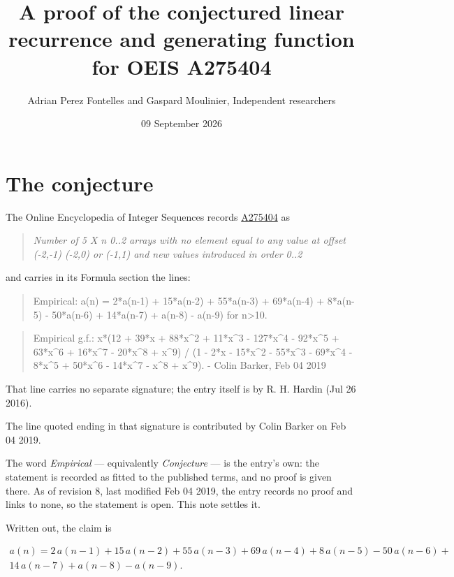 \documentclass[11pt]{article}
\title{A proof of the conjectured linear recurrence and generating function for OEIS A275404}
\author{Adrian Perez Fontelles and Gaspard Moulinier, Independent researchers}
\date{09 September 2026}
\theoremstyle{definition}
\begin{document}
\maketitle
\section{The conjecture}

The Online Encyclopedia of Integer Sequences records \href{https://oeis.org/A275404}{A275404} as

\begin{quote}\itshape Number of 5 X n 0..2 arrays with no element equal to any value at offset (-2,-1) (-2,0) or (-1,1) and new values introduced in order 0..2\end{quote}

and carries in its Formula section the lines:

\begin{quote}\ttfamily Empirical: a(n) = 2*a(n-1) + 15*a(n-2) + 55*a(n-3) + 69*a(n-4) + 8*a(n-5) - 50*a(n-6) + 14*a(n-7) + a(n-8) - a(n-9) for n>10.\end{quote}

\begin{quote}\ttfamily Empirical g.f.: x*(12 + 39*x + 88*x\textasciicircum{}2 + 11*x\textasciicircum{}3 - 127*x\textasciicircum{}4 - 92*x\textasciicircum{}5 + 63*x\textasciicircum{}6 + 16*x\textasciicircum{}7 - 20*x\textasciicircum{}8 + x\textasciicircum{}9) / (1 - 2*x - 15*x\textasciicircum{}2 - 55*x\textasciicircum{}3 - 69*x\textasciicircum{}4 - 8*x\textasciicircum{}5 + 50*x\textasciicircum{}6 - 14*x\textasciicircum{}7 - x\textasciicircum{}8 + x\textasciicircum{}9). - Colin Barker, Feb 04 2019\end{quote}

That line carries no separate signature; the entry itself is by R. H. Hardin (Jul 26 2016).

The line quoted ending in that signature is contributed by Colin Barker on Feb 04 2019.

The word {\itshape Empirical} --- equivalently {\itshape Conjecture} --- is the entry's own: the statement is recorded as fitted to the published terms, and no proof is given there. As of revision 8, last modified Feb 04 2019, the entry records no proof and links to none, so the statement is open. This note settles it.

Written out, the claim is

\begin{multline*} a(n) = 2\,a(n-1) + 15\,a(n-2) + 55\,a(n-3) + 69\,a(n-4) + 8\,a(n-5) - 50\,a(n-6) + \\ 14\,a(n-7) + a(n-8) - a(n-9). \end{multline*}
\end{document}
